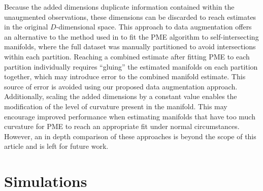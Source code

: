 \documentclass[11pt,reqno]{article}
\theoremstyle{definition}
\begin{document}
Because the added dimensions duplicate information contained within the unaugmented observations, these dimensions can be discarded to reach estimates in the original $D$-dimensional space. This approach to data augmentation offers an alternative to the method used in \cite{mengPrincipalManifoldEstimation2021} to fit the PME algorithm to self-intersecting manifolds, where the full dataset was manually partitioned to avoid intersections within each partition. Reaching a combined estimate after fitting PME to each partition individually requires ``gluing'' the estimated manifolds on each partition together, which may introduce error to the combined manifold estimate. This source of error is avoided using our proposed data augmentation approach. Additionally, scaling the added dimensions by a constant value enables the modification of the level of curvature present in the manifold. This may encourage improved performance when estimating manifolds that have too much curvature for PME to reach an appropriate fit under normal circumstances. However, an in depth comparison of these approaches is beyond the scope of this article and is left for future work.





\section{Simulations}\label{s:simulations}
\end{document}
